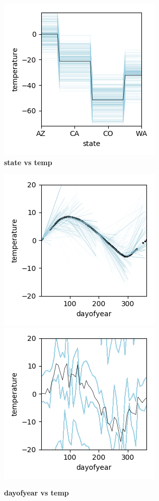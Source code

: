 \documentclass[12pt]{article}
\begin{document}
\begin{figure}[htbp]
\begin{center}
\includegraphics[scale=0.7]{images/state_vs_temp_pdp.png}
\caption{{\bf  state  vs temp}}
\label{fig:state_vs_temp}
\end{center}
\end{figure}

\begin{figure}[htbp]
\begin{center}
\includegraphics[scale=0.7]{images/dayofyear_vs_temp_stratpd.png}
\includegraphics[scale=0.7]{images/dayofyear_vs_temp_pdp.png}
\caption{{\bf  dayofyear  vs temp}}
\label{fig:dayofyear_vs_temp}
\end{center}
\end{figure}
\end{document}
